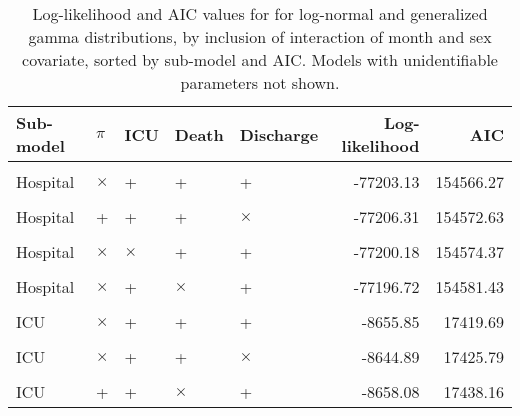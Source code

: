 \begin{table}[!h]
\centering
\caption{\label{tab:gof_int}Log-likelihood and AIC values for for log-normal and generalized gamma distributions, by inclusion of interaction of month and sex covariate, sorted by sub-model and AIC. Models with unidentifiable parameters not shown.}
\centering
\begin{tabular}[t]{lllllrr}
\toprule
Sub-model & $\pi$ & ICU & Death & Discharge & Log-likelihood & AIC\\
\midrule
\cellcolor{gray!10}{Hospital} & \cellcolor{gray!10}{+} & \cellcolor{gray!10}{+} & \cellcolor{gray!10}{+} & \cellcolor{gray!10}{+} & \cellcolor{gray!10}{-77213.81} & \cellcolor{gray!10}{154559.61}\\
Hospital & $\times$ & + & + & + & -77203.13 & 154566.27\\
\cellcolor{gray!10}{Hospital} & \cellcolor{gray!10}{+} & \cellcolor{gray!10}{$\times$} & \cellcolor{gray!10}{+} & \cellcolor{gray!10}{+} & \cellcolor{gray!10}{-77210.84} & \cellcolor{gray!10}{154567.67}\\
Hospital & + & + & + & $\times$ & -77206.31 & 154572.63\\
\cellcolor{gray!10}{Hospital} & \cellcolor{gray!10}{+} & \cellcolor{gray!10}{+} & \cellcolor{gray!10}{$\times$} & \cellcolor{gray!10}{+} & \cellcolor{gray!10}{-77206.47} & \cellcolor{gray!10}{154572.94}\\
Hospital & $\times$ & $\times$ & + & + & -77200.18 & 154574.37\\
\cellcolor{gray!10}{Hospital} & \cellcolor{gray!10}{$\times$} & \cellcolor{gray!10}{+} & \cellcolor{gray!10}{+} & \cellcolor{gray!10}{$\times$} & \cellcolor{gray!10}{-77195.40} & \cellcolor{gray!10}{154578.80}\\
Hospital & $\times$ & + & $\times$ & + & -77196.72 & 154581.43\\
\cellcolor{gray!10}{ICU} & \cellcolor{gray!10}{+} & \cellcolor{gray!10}{+} & \cellcolor{gray!10}{+} & \cellcolor{gray!10}{+} & \cellcolor{gray!10}{-8662.31} & \cellcolor{gray!10}{17418.62}\\
ICU & $\times$ & + & + & + & -8655.85 & 17419.69\\
\cellcolor{gray!10}{ICU} & \cellcolor{gray!10}{+} & \cellcolor{gray!10}{+} & \cellcolor{gray!10}{+} & \cellcolor{gray!10}{$\times$} & \cellcolor{gray!10}{-8651.46} & \cellcolor{gray!10}{17424.92}\\
ICU & $\times$ & + & + & $\times$ & -8644.89 & 17425.79\\
\cellcolor{gray!10}{ICU} & \cellcolor{gray!10}{$\times$} & \cellcolor{gray!10}{+} & \cellcolor{gray!10}{$\times$} & \cellcolor{gray!10}{+} & \cellcolor{gray!10}{-8650.85} & \cellcolor{gray!10}{17437.70}\\
ICU & + & + & $\times$ & + & -8658.08 & 17438.16\\
\bottomrule
\end{tabular}
\end{table}
